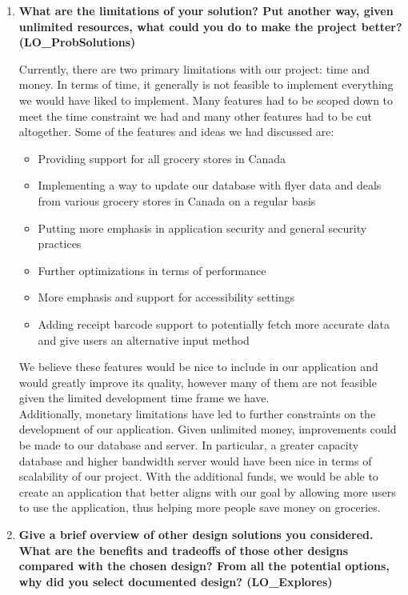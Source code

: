 \documentclass[12pt, titlepage]{article}
\begin{document}
\begin{enumerate}
  \item \textbf{What are the limitations of your solution?  Put another way, given
  unlimited resources, what could you do to make the project better? (LO\_ProbSolutions)}

  Currently, there are two primary limitations with our project: time and money. In terms
  of time, it generally is not feasible to implement everything we would have liked to implement.
  Many features had to be scoped down to meet the time constraint we had and
  many other features had to be cut altogether. Some of the features and ideas we had discussed
  are:
  \begin{itemize}
    \item Providing support for all grocery stores in Canada
    \item Implementing a way to update our database with flyer data and deals from
    various grocery stores in Canada on a regular basis 
    \item Putting more emphasis in application security and general security practices
    \item Further optimizations in terms of performance
    \item More emphasis and support for accessibility settings
    \item Adding receipt barcode support to potentially fetch more accurate data and
    give users an alternative input method
  \end{itemize}
  We believe these features would be nice to include in our application and would greatly
  improve its quality, however many of them are not feasible given the limited development time frame
  we have.\\

  Additionally, monetary limitations have led to further constraints on the development of our application.
  Given unlimited money, improvements could be made to our database and server. In particular,
  a greater capacity database and higher bandwidth server would have been nice in terms of scalability of our
  project. With the additional funds, we would be able to create an application that better aligns with our goal
  by allowing more users to use the application, thus helping more people save money on groceries.

  \item \textbf{Give a brief overview of other design solutions you considered.  What
  are the benefits and tradeoffs of those other designs compared with the chosen
  design?  From all the potential options, why did you select documented design?
  (LO\_Explores)}


\end{enumerate}
\end{document}
